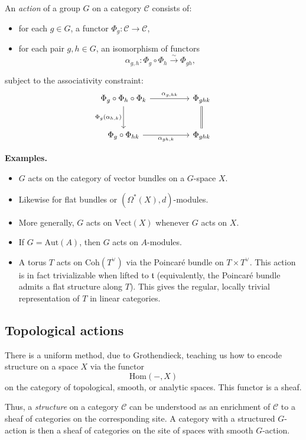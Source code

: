 \documentclass[12pt]{article}
\begin{document}
\begin{definition}
An \emph{action} of a group $G$ on a category $\mathcal C$ consists of:
\begin{itemize}
    \item for each $g \in G$, a functor $\Phi_g : \mathcal C \to \mathcal C$,
    \item for each pair $g,h \in G$, an isomorphism of functors
    \[
    \alpha_{g,h} : \Phi_g \circ \Phi_h \xrightarrow{\;\sim\;} \Phi_{gh},
    \]
\end{itemize}
subject to the associativity constraint:
\[
\begin{tikzcd}[column sep=huge, row sep=large]
\Phi_g \circ \Phi_h \circ \Phi_k
  \ar[r, "\alpha_{g, hk}"]
  \ar[d, "\Phi_g(\alpha_{h,k})"']
& \Phi_{ghk} \\
\Phi_g \circ \Phi_{hk}
  \ar[r, "\alpha_{gh,k}"']
& \Phi_{ghk} \ar[u, equal]
\end{tikzcd}
\]
\end{definition}


\textbf{Examples.}
\begin{itemize}
    \item $G$ acts on the category of vector bundles on a $G$-space $X$.
    \item Likewise for flat bundles or $(\Omega^*(X),d)$-modules.
    \item More generally, $G$ acts on $\mathrm{Vect}(X)$ whenever $G$ acts on $X$.
    \item If $G = \mathrm{Aut}(A)$, then $G$ acts on $A$-modules.
    \item A torus $T$ acts on $\mathrm{Coh}(T^\vee)$ via the Poincaré bundle on $T \times T^\vee$.
    This action is in fact trivializable when lifted to $\mathfrak t$
    (equivalently, the Poincaré bundle admits a flat structure along $T$).
    This gives the regular, locally trivial representation of $T$
    in linear categories.
\end{itemize}
\subsection{Topological actions}
There is a uniform method, due to Grothendieck, teaching us how to encode
structure on a space $X$ via the functor
\[
\mathrm{Hom}(-, X)
\]
on the category of topological, smooth, or analytic spaces. This functor is a sheaf.

\medskip
Thus, a \emph{structure} on a category $\mathcal C$ can be understood
as an enrichment of $\mathcal C$ to a sheaf of categories on the corresponding site. A category with a structured $G$-action is then a sheaf of categories
on the site of spaces with smooth $G$-action.
\end{document}
